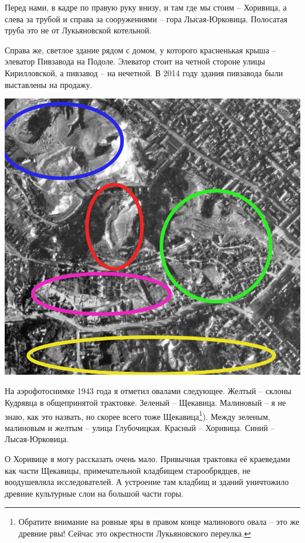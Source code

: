 Перед нами, в кадре по правую руку внизу, и там где мы стоим – Хоривица, а слева за трубой и справа за сооружениями – гора Лысая-Юрковица. Полосатая труба это не от Лукьяновской котельной. 

Справа же, светлое здание рядом с домом, у которого красненькая крыша – элеватор Пивзавода на Подоле. Элеватор стоит на четной стороне улицы Кирилловской, а пивзавод – на нечетной. В 2014 году здания пивзавода были выставлены на продажу.

\begin{center}
\includegraphics[width=\linewidth]{chast-kirvys/yourk/y.jpg}
\end{center} 

На аэрофотоснимке 1943 года я отметил овалами следующее. Желтый – склоны Кудрявца в общепринятой трактовке. Зеленый – Щекавица. Малиновый – я не знаю, как это назвать, но скорее всего тоже Щекавица\footnote{Обратите внимание на ровные яры в правом конце малинового овала – это же древние рвы! Сейчас это окрестности Лукьяновского переулка.}). Между зеленым, малиновым и желтым – улица Глубочицкая. Красный – Хоривица. Синий – Лысая-Юрковица.

О Хоривице я могу рассказать очень мало. Привычная трактовка её краеведами как части Щекавицы, примечательной кладбищем старообрядцев, не воодушевляла исследователей. А устроение там кладбищ и зданий уничтожило древние культурные слои на большой части горы.


